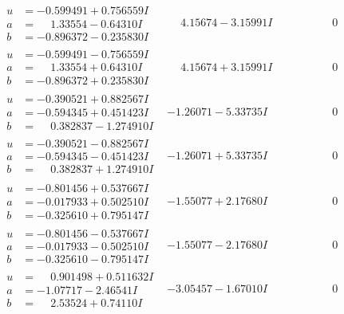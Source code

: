 \documentclass[1p]{elsarticle_modified}
\theoremstyle{definition}
\begin{document}
$$\begin{array}{c|c|c}
\begin{aligned}
u &= -0.599491 + 0.756559 I \\
a &= \phantom{-}1.33554 - 0.64310 I \\
b &= -0.896372 - 0.235830 I\end{aligned}
 & \phantom{-}4.15674 - 3.15991 I & \phantom{-0.000000 } 0 \\ \hline\begin{aligned}
u &= -0.599491 - 0.756559 I \\
a &= \phantom{-}1.33554 + 0.64310 I \\
b &= -0.896372 + 0.235830 I\end{aligned}
 & \phantom{-}4.15674 + 3.15991 I & \phantom{-0.000000 } 0 \\ \hline\begin{aligned}
u &= -0.390521 + 0.882567 I \\
a &= -0.594345 + 0.451423 I \\
b &= \phantom{-}0.382837 - 1.274910 I\end{aligned}
 & -1.26071 - 5.33735 I & \phantom{-0.000000 } 0 \\ \hline\begin{aligned}
u &= -0.390521 - 0.882567 I \\
a &= -0.594345 - 0.451423 I \\
b &= \phantom{-}0.382837 + 1.274910 I\end{aligned}
 & -1.26071 + 5.33735 I & \phantom{-0.000000 } 0 \\ \hline\begin{aligned}
u &= -0.801456 + 0.537667 I \\
a &= -0.017933 + 0.502510 I \\
b &= -0.325610 + 0.795147 I\end{aligned}
 & -1.55077 + 2.17680 I & \phantom{-0.000000 } 0 \\ \hline\begin{aligned}
u &= -0.801456 - 0.537667 I \\
a &= -0.017933 - 0.502510 I \\
b &= -0.325610 - 0.795147 I\end{aligned}
 & -1.55077 - 2.17680 I & \phantom{-0.000000 } 0 \\ \hline\begin{aligned}
u &= \phantom{-}0.901498 + 0.511632 I \\
a &= -1.07717 - 2.46541 I \\
b &= \phantom{-}2.53524 + 0.74110 I\end{aligned}
 & -3.05457 - 1.67010 I & \phantom{-0.000000 } 0 \\ \hline\begin{aligned}

\end{aligned}
\end{array}$$
\end{document}
